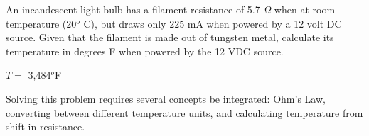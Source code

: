 

An incandescent light bulb has a filament resistance of 5.7 $\Omega$ when at room temperature (20$^{o}$ C), but draws only 225 mA when powered by a 12 volt DC source.  Given that the filament is made out of tungsten metal, calculate its temperature in degrees F when powered by the 12 VDC source.







$T =$ 3,484$^{o}$F 







Solving this problem requires several concepts be integrated: Ohm's Law, converting between different temperature units, and calculating temperature from shift in resistance.




